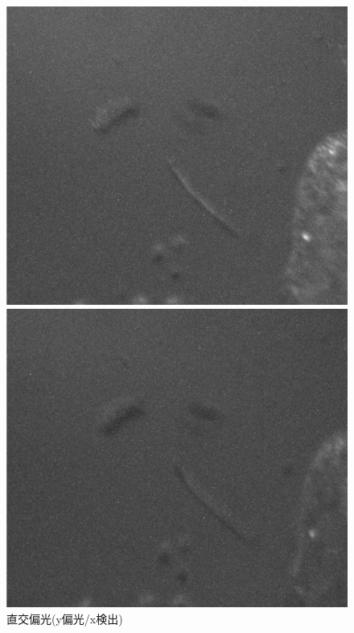 \documentclass[11pt,a4paper]{jsarticle}
\begin{document}
\begin{figure}[htbp]
 \begin{minipage}{0.333\hsize}
  \begin{center}
   \includegraphics[width=\hsize]{vh300.eps}
  \end{center}
  \caption{直交偏光(y偏光/x検出)}
  \label{fig:vh300}
 \end{minipage}
 \begin{minipage}{0.333\hsize}
  \begin{center}
   \includegraphics[width=\hsize]{hv300.eps}

\end{center}
\end{minipage}
\end{figure}
\end{document}
